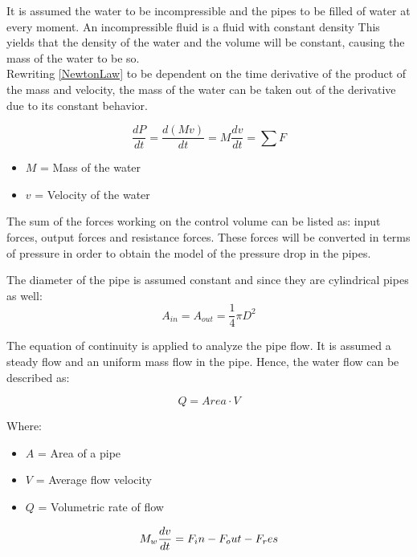 It is assumed the water to be incompressible and the pipes to be filled of water at every moment. 
An incompressible fluid is a fluid with constant density
This yields that the density of the water and the volume will be constant, causing the mass of the water to be so. 
\\
Rewriting \ref{NewtonLaw} to be dependent on the time derivative of the product 
of the mass and velocity, the mass of the water can be taken out of the derivative due to its constant behavior.

\begin{equation}
  \frac{dP}{dt} = {\frac{d(M v)}{dt}} = M \frac{dv}{dt} = \sum F
\end{equation} 

\begin{itemize}
  \item  $M$ = Mass of the water
  \item $v$ = Velocity of the water
\end{itemize}

The sum of the forces working on the control volume can be listed as: input forces, output forces and resistance forces.  
These forces will be converted in terms of pressure in order to obtain the model of the pressure drop in the pipes. 

The diameter of the pipe is assumed constant and since they are cylindrical pipes as well:
\begin{equation}
  A_{in} = A_{out} = \frac{1}{4}\pi D^{2}
\end{equation}

The equation of continuity is applied to analyze the pipe flow. It is assumed a steady flow and an uniform 
mass flow in the pipe. Hence, the water flow can be described as: 

\begin{equation}
  Q=Area \cdot V
	\label{EquationOfContinuity}
\end{equation}

Where: 

\begin{itemize}
  \item  $A$ = Area of a pipe
  \item $V$ = Average flow velocity
  \item $Q$ = Volumetric rate of flow
\end{itemize}

\begin{equation}
  M_w \frac{dv}{dt} = F_in - F_out - F_res \\
\end{equation}

